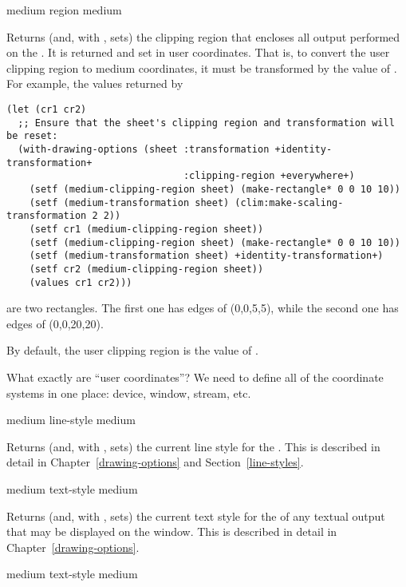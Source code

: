  {medium}
 {region medium}

Returns (and, with , sets) the clipping region that encloses all output
performed on the  .  It is returned and set in user
coordinates.  That is, to convert the user clipping region to medium
coordinates, it must be transformed by the value of .
For example, the values returned by

\begin{verbatim}
(let (cr1 cr2)
  ;; Ensure that the sheet's clipping region and transformation will be reset:
  (with-drawing-options (sheet :transformation +identity-transformation+
                               :clipping-region +everywhere+)
    (setf (medium-clipping-region sheet) (make-rectangle* 0 0 10 10))
    (setf (medium-transformation sheet) (clim:make-scaling-transformation 2 2))
    (setf cr1 (medium-clipping-region sheet))
    (setf (medium-clipping-region sheet) (make-rectangle* 0 0 10 10))
    (setf (medium-transformation sheet) +identity-transformation+)
    (setf cr2 (medium-clipping-region sheet))
    (values cr1 cr2)))
\end{verbatim}

are two rectangles.  The first one has edges of (0,0,5,5), while the second one
has edges of (0,0,20,20).

By default, the user clipping region is the value of .

 {What exactly are ``user coordinates''?  We need to define all of
the coordinate systems in one place: device, window, stream, etc.}


 {medium}
 {line-style medium}

Returns (and, with , sets) the current line style for the 
.  This is described in detail in Chapter~\ref{drawing-options} and
Section~\ref{line-styles}.


 {medium}
 {text-style medium}

Returns (and, with , sets) the current text style for the 
 of any textual output that may be displayed on the window.  This is
described in detail in Chapter~\ref{drawing-options}.


 {medium}
 {text-style medium}

